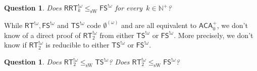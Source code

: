 \documentclass{article}
\newcommand{\RCA}[0]{\mathsf{RCA}}
\newcommand{\ACA}[0]{\mathsf{ACA}}
\newcommand{\RRT}[0]{\mathsf{RRT}}
\newcommand{\FS}[0]{\mathsf{FS}}
\newcommand{\TS}[0]{\mathsf{TS}}
\newcommand{\RT}[0]{\mathsf{RT}}
\newcommand{\NN}[0]{\mathbb{N}}
\newcommand{\sW}{\mathrm{sW}}
\numberwithin{theorem}{section}
\newtheorem{question}[theorem]{Question}
\newcommand{\quentin}[1]{\textcolor{green}{#1}}
\newcommand{\lorenzo}[1]{\textcolor{orange}{#1}}
\begin{document}
\begin{question}
Does $\RRT^{!\omega}_k \leq_\sW \FS^{!\omega}$ for every~$k \in \NN^+$?
\end{question}


While $\RT^{!\omega}, \FS^{!\omega}$ and $\TS^{!\omega}$
code $\emptyset^{(\omega)}$ and are all equivalent to $\ACA_0^+$, we 
don't know of a direct proof of $\RT^{!\omega}_2$ from either $\TS^{!\omega}$ or $\FS^{!\omega}$. More precisely, 
we don't know if $\RT^{!\omega}_2$ is reducible to either $\TS^{!\omega}$ or $\FS^{!\omega}$.

\begin{question}
Does $\RT^{!\omega}_2 \leq_\sW \TS^{!\omega}$? Does $\RT^{!\omega}_2 \leq_\sW \FS^{!\omega}$?
\end{question}




\end{document}
